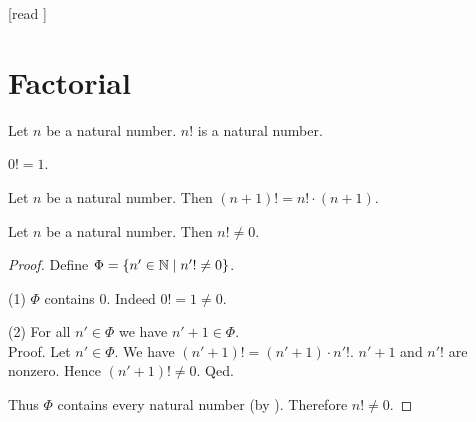 \documentclass[10pt]{article}
\begin{document}
  \begin{imports}
    \begin{forthel}
      [read ]
    \end{forthel}
  \end{imports}


  \section*{Factorial}

  \begin{forthel}
    \begin{signature}[id=ARITHMETIC_12_0210357812531785,printid]
      Let $n$ be a natural number.
      $n!$ is a natural number.
    \end{signature}
  \end{forthel}

  \begin{forthel}
    \begin{axiom}[id=ARITHMETIC_12_6945210541236989,printid]
      $0! = 1$.
    \end{axiom}
  \end{forthel}

  \begin{forthel}
    \begin{axiom}[id=ARITHMETIC_12_2312015846987452,printid]
      Let $n$ be a natural number.
      Then $(n + 1)! = n! \cdot (n + 1)$.
    \end{axiom}
  \end{forthel}

  \begin{forthel}
    \begin{proposition}[id=ARITHMETIC_12_6123519005949952,printid]
      Let $n$ be a natural number.
      Then $n! \neq 0$.
    \end{proposition}
    \begin{proof}
      Define $\Phi = \{n' \in \mathbb{N} \mid n'! \neq 0 \}$.

      (1) $\Phi$ contains $0$.
      Indeed $0! = 1 \neq 0$.

      (2) For all $n' \in \Phi$ we have $n' + 1 \in \Phi$. \\
      Proof.
        Let $n' \in \Phi$.
        We have $(n' + 1)! = (n' + 1) \cdot n'!$.
        $n' + 1$ and $n'!$ are nonzero.
        Hence $(n' + 1)! \neq 0$.
      Qed.

      Thus $\Phi$ contains every natural number (by ).
      Therefore $n! \neq 0$.
    \end{proof}
  \end{forthel}
\end{document}
